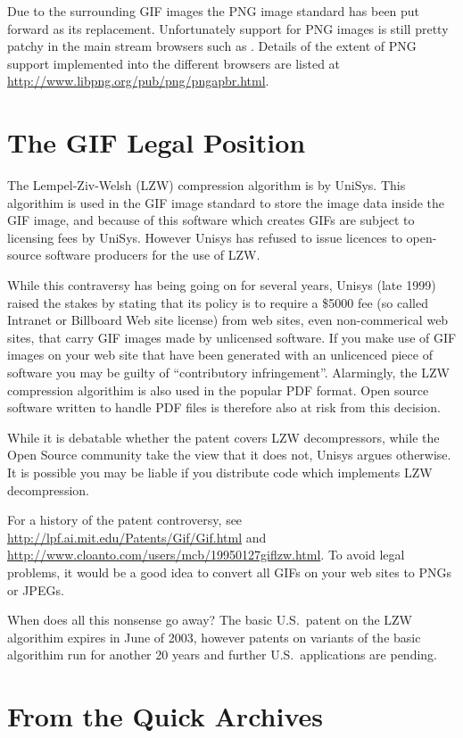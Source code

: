 \documentclass[twoside,11pt]{starlink}
\begin{document}
Due to the  surrounding GIF
images the PNG image standard has been put forward as its replacement.
Unfortunately support for PNG images is still pretty patchy in the
main stream browsers such as . Details of the extent of PNG
support implemented into the different browsers are listed at
\url{http://www.libpng.org/pub/png/pngapbr.html}.

\section{The GIF Legal Position\label{sc15_giflegal}}

The Lempel-Ziv-Welsh (LZW) compression algorithm is
by UniSys.  This algorithim is used in the GIF image standard to store
the image data inside the GIF image, and because of this software
which creates GIFs are subject to licensing fees by UniSys. However
Unisys has refused to issue licences to open-source software producers
for the use of LZW.

While this contraversy has being going on for several years, Unisys
(late 1999) raised the stakes by stating that its policy is to require
a \$5000 fee (so called Intranet or Billboard Web site license) from
web sites, even non-commerical web sites, that carry GIF images made
by unlicensed software. If you make use of GIF images on your web site
that have been generated with an unlicenced piece of software you may
be guilty of ``contributory infringement''. Alarmingly, the LZW
compression algorithim is also used in the popular PDF format. Open
source software written to handle PDF files is therefore also at risk
from this decision.

While it is debatable whether the patent covers LZW decompressors,
while the Open Source community take the view that it does not, Unisys
argues otherwise. It is possible you may be liable if you distribute
code which implements LZW decompression.

For a history of the patent controversy, see \url{http://lpf.ai.mit.edu/Patents/Gif/Gif.html}
and \url{http://www.cloanto.com/users/mcb/19950127giflzw.html}.
To avoid legal problems, it would be a good idea to convert all GIFs
on your web sites to PNGs or JPEGs.

When does all this nonsense go away? The basic U.S.\ patent on the LZW
algorithim expires in June of 2003, however patents on variants of the
basic algorithim run for another 20 years and further U.S.\
applications are pending.  \section{From the
Quick Archives\label{sc15_archives}}
\end{document}
